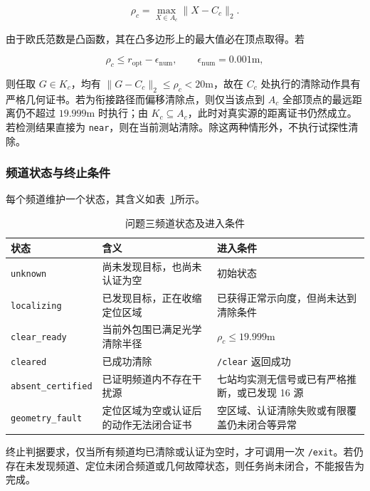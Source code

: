 \begin{equation}
\rho_c=\max_{X\in A_c}\lVert X-C_c\rVert_2.
\label{eq:q3_outer_radius}
\end{equation}

由于欧氏范数是凸函数，其在凸多边形上的最大值必在顶点取得。若

\begin{equation}
\rho_c\le r_{\mathrm{opt}}-\epsilon_{\mathrm{num}},
\qquad
\epsilon_{\mathrm{num}}=0.001\mathrm{m},
\label{eq:q3_clear_certificate}
\end{equation}

则任取 $G\in K_c$，均有 $\lVert G-C_c\rVert_2\le\rho_c<20\mathrm{m}$，故在 $C_c$ 处执行的清除动作具有严格几何证书。若为衔接路径而偏移清除点，则仅当该点到 $A_c$ 全部顶点的最远距离仍不超过 $19.999\mathrm{m}$ 时执行；由 $K_c\subseteq A_c$，此时对真实源的距离证书仍然成立。若检测结果直接为 \texttt{near}，则在当前测站清除。除这两种情形外，不执行试探性清除。

\subsubsection{频道状态与终止条件}

每个频道维护一个状态，其含义如表~\ref{tab:q3_states}所示。

\begin{table}[htbp]
\centering
\small
\setlength{\tabcolsep}{4pt}
\caption{问题三频道状态及进入条件}
\label{tab:q3_states}
\begin{tabular}{lll}
\toprule
状态 & 含义 & 进入条件 \\
\midrule
\texttt{unknown} & 尚未发现目标，也尚未认证为空 & 初始状态 \\
\texttt{localizing} & 已发现目标，正在收缩定位区域 & 已获得正常示向度，但尚未达到清除条件 \\
\texttt{clear\_ready} & 当前外包围已满足光学清除半径 & $\rho_c\le19.999\mathrm{m}$ \\
\texttt{cleared} & 已成功清除 & \texttt{/clear} 返回成功 \\
\texttt{absent\_certified} & 已证明频道内不存在干扰源 & 七站均实测无信号或已有严格推断，或已发现 16 源 \\
\texttt{geometry\_fault} & 定位区域为空或认证后的动作无法闭合证书 & 空区域、认证清除失败或有限覆盖仍未闭合等异常 \\
\bottomrule
\end{tabular}
\end{table}

终止判据要求，仅当所有频道均已清除或认证为空时，才可调用一次 \texttt{/exit}。若仍存在未发现频道、定位未闭合频道或几何故障状态，则任务尚未闭合，不能报告为完成。

